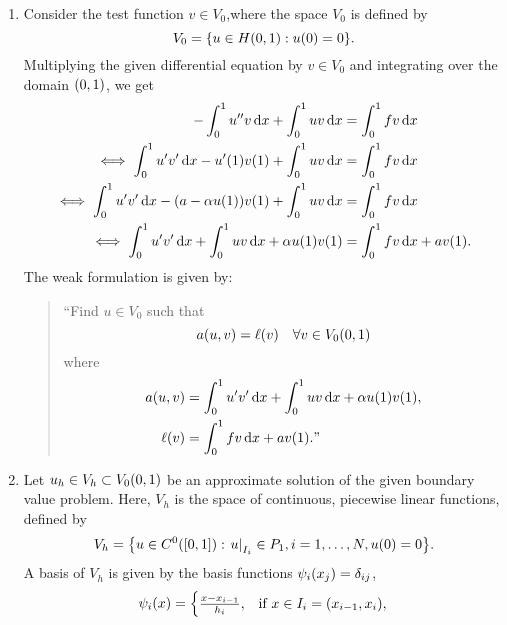 \documentclass[english]{exercise}
\begin{document}
    \begin{enumerate}
        \item Consider the test function \(v \in V_0\),where the space \(V_0\) is defined by
        \[
            V_0 = \braces*{u \in H\parentheses*{0, 1} : u\parentheses*{0} = 0}.
        \]
        Multiplying the given differential equation by \(v \in V_0\) and integrating over the domain \(\parentheses*{0, 1}\), we get
        \begin{align*}
            -\int_0^1 u''v\d x + \int_0^1 uv\d x &= \int_0^1 fv\d x\\
            \iff \int_0^1 u'v'\d x - u'\parentheses*{1}v\parentheses*{1} + \int_0^1 uv\d x &= \int_0^1 fv\d x\\
            \iff \int_0^1 u'v'\d x - \parentheses*{a - \alpha u\parentheses*{1}}v\parentheses*{1} + \int_0^1 uv\d x &= \int_0^1 fv\d x\\
            \iff \int_0^1 u'v'\d x + \int_0^1 uv\d x + \alpha u\parentheses*{1}v\parentheses*{1} &= \int_0^1 fv\d x + av\parentheses*{1}.
        \end{align*}
        The weak formulation is given by:
        \begin{quote}
            ``Find \(u \in V_0\) such that
            \[
                a\parentheses*{u, v} = \ell\parentheses*{v} \quad \forall v \in V_0\parentheses*{0, 1}
            \]
            where
            \begin{align*}
                a\parentheses*{u, v} &= \int_0^1 u'v'\d x + \int_0^1 uv\d x + \alpha u\parentheses*{1}v\parentheses*{1},\\
                \ell\parentheses*{v} &= \int_0^1 fv\d x + av\parentheses*{1}.\text{''}
            \end{align*}
        \end{quote}
        \item Let \(u_h \in V_h \subset V_0\parentheses*{0, 1}\) be an approximate solution of the given boundary value problem.
        Here, \(V_h\) is the space of continuous, piecewise linear functions, defined by
        \[
            V_h = \braces*{u \in C^0\parentheses*{\brackets*{0, 1}} : \left.u\right|_{I_i} \in P_1, i = 1, \ldots, N, u\parentheses*{0} = 0}.
        \]
        A basis of \(V_h\) is given by the basis functions \(\psi_i\parentheses*{x_j} = \delta_{ij}\),
        \[
            \psi_i\parentheses*{x} = \begin{cases}
                \frac{x - x_{i - 1}}{h_i}, & \text{if }x \in I_i = \parentheses*{x_{i - 1}, x_i},\\

\end{cases}\]
\end{enumerate}
\end{document}
